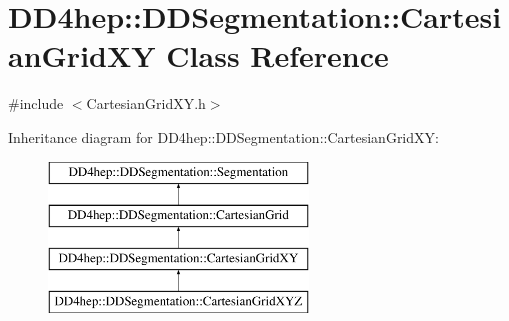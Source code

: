 \hypertarget{class_d_d4hep_1_1_d_d_segmentation_1_1_cartesian_grid_x_y}{}\section{D\+D4hep\+:\+:D\+D\+Segmentation\+:\+:Cartesian\+Grid\+XY Class Reference}
\label{class_d_d4hep_1_1_d_d_segmentation_1_1_cartesian_grid_x_y}


{\ttfamily \#include $<$Cartesian\+Grid\+X\+Y.\+h$>$}

Inheritance diagram for D\+D4hep\+:\+:D\+D\+Segmentation\+:\+:Cartesian\+Grid\+XY\+:\begin{figure}[H]
\begin{center}
\leavevmode
\includegraphics[height=4.000000cm]{class_d_d4hep_1_1_d_d_segmentation_1_1_cartesian_grid_x_y}
\end{center}
\end{figure}

